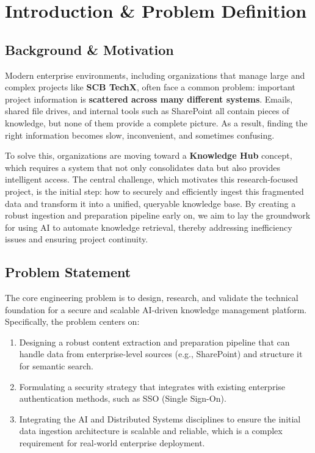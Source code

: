 \documentclass[12pt]{article}
\begin{document}
\newpage

\tableofcontents
\newpage

\section{Introduction \& Problem Definition}

\subsection{Background \& Motivation}
Modern enterprise environments, including organizations that manage large and complex projects like \textbf{SCB TechX}, often face a common problem: important project information is \textbf{scattered across many different systems}. Emails, shared file drives, and internal tools such as SharePoint all contain pieces of knowledge, but none of them provide a complete picture. As a result, finding the right information becomes slow, inconvenient, and sometimes confusing.

To solve this, organizations are moving toward a \textbf{Knowledge Hub} concept, which requires a system that not only consolidates data but also provides intelligent access. The central challenge, which motivates this research-focused project, is the initial step: how to securely and efficiently ingest this fragmented data and transform it into a unified, queryable knowledge base. By creating a robust ingestion and preparation pipeline early on, we aim to lay the groundwork for using AI to automate knowledge retrieval, thereby addressing inefficiency issues and ensuring project continuity.

\subsection{Problem Statement}
The core engineering problem is to design, research, and validate the technical foundation for a secure and scalable AI-driven knowledge management platform. Specifically, the problem centers on:
\begin{enumerate}
    \item Designing a robust content extraction and preparation pipeline that can handle data from enterprise-level sources (e.g., SharePoint) and structure it for semantic search.
    \item Formulating a security strategy that integrates with existing enterprise authentication methods, such as SSO (Single Sign-On).
    \item Integrating the AI and Distributed Systems disciplines to ensure the initial data ingestion architecture is scalable and reliable, which is a complex requirement for real-world enterprise deployment.
\end{enumerate}
\end{document}
